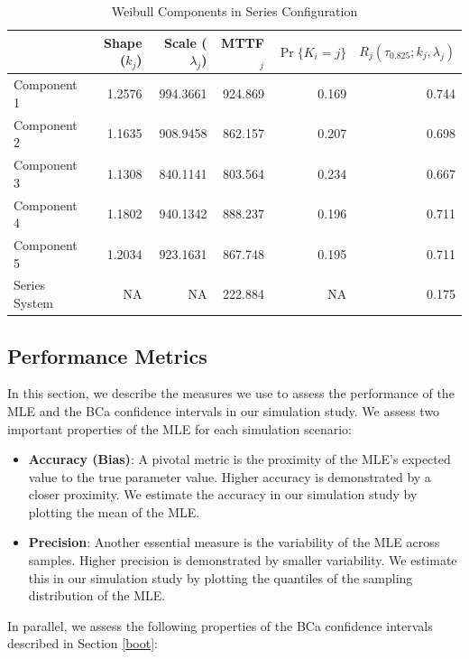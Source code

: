 \documentclass[
]{article}
\theoremstyle{definition}
\theoremstyle{plain}
\theoremstyle{definition}
\theoremstyle{definition}
\theoremstyle{definition}
\theoremstyle{definition}
\theoremstyle{remark}
\begin{document}
\begin{table}

\caption{\label{tab:series-sys}Weibull Components in Series Configuration}
\centering
\begin{tabular}[t]{l|r|r|r|r|r}
\hline
  & Shape ($k_j$) & Scale ($\lambda_j$) & MTTF$_j$ & $\Pr\{K_i = j\}$ & $R_j(\tau_{0.825};k_j,\lambda_j)$\\
\hline
Component 1 & 1.2576 & 994.3661 & 924.869 & 0.169 & 0.744\\
\hline
Component 2 & 1.1635 & 908.9458 & 862.157 & 0.207 & 0.698\\
\hline
Component 3 & 1.1308 & 840.1141 & 803.564 & 0.234 & 0.667\\
\hline
Component 4 & 1.1802 & 940.1342 & 888.237 & 0.196 & 0.711\\
\hline
Component 5 & 1.2034 & 923.1631 & 867.748 & 0.195 & 0.711\\
\hline
Series System & NA & NA & 222.884 & NA & 0.175\\
\hline
\end{tabular}
\end{table}

\hypertarget{performance-metrics}{%
\subsection{Performance Metrics}\label{performance-metrics}}

In this section, we describe the measures we use to assess the performance of
the MLE and the BCa confidence intervals in our simulation study. We assess two
important properties of the MLE for each simulation scenario:

\begin{itemize}
\item
  \textbf{Accuracy (Bias)}: A pivotal metric is the proximity of the MLE's expected
  value to the true parameter value. Higher accuracy is demonstrated by a
  closer proximity. We estimate the accuracy in our simulation study by plotting
  the mean of the MLE.
\item
  \textbf{Precision}: Another essential measure is the variability of the MLE across
  samples. Higher precision is demonstrated by smaller variability. We estimate
  this in our simulation study by plotting the quantiles of the sampling
  distribution of the MLE.
\end{itemize}

In parallel, we assess the following properties of the BCa confidence intervals
described in Section \ref{boot}:
\end{document}
